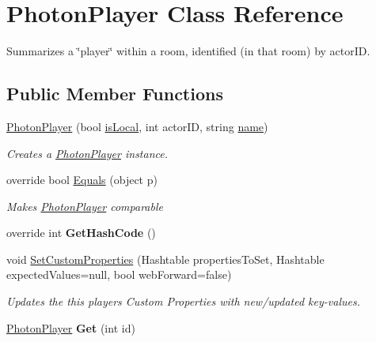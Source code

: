 \hypertarget{class_photon_player}{}\section{Photon\+Player Class Reference}
\label{class_photon_player}


Summarizes a \char`\"{}player\char`\"{} within a room, identified (in that room) by actor\+ID.  


\subsection*{Public Member Functions}
\begin{DoxyCompactItemize}
\item 
\hyperlink{class_photon_player_ab4efd41ca7624963586a30e0d360da67}{Photon\+Player} (bool \hyperlink{class_photon_player_a7d51daf7a538dadae8339e95bf39e692}{is\+Local}, int actor\+ID, string \hyperlink{class_photon_player_a74e5bb916dbfdb6960b8f2f11fa6aba9}{name})
\begin{DoxyCompactList}\small\item\em Creates a \hyperlink{class_photon_player}{Photon\+Player} instance. \end{DoxyCompactList}\item 
override bool \hyperlink{class_photon_player_a2c234cfef38c2013337182a008844398}{Equals} (object p)
\begin{DoxyCompactList}\small\item\em Makes \hyperlink{class_photon_player}{Photon\+Player} comparable \end{DoxyCompactList}\item 
override int {\bfseries Get\+Hash\+Code} ()\hypertarget{class_photon_player_af88693cf6b3b3fb1c8afdb5892fd525c}{}\label{class_photon_player_af88693cf6b3b3fb1c8afdb5892fd525c}

\item 
void \hyperlink{class_photon_player_af8815abb8edaafbe6bddbf328f9612fb}{Set\+Custom\+Properties} (Hashtable properties\+To\+Set, Hashtable expected\+Values=null, bool web\+Forward=false)
\begin{DoxyCompactList}\small\item\em Updates the this player\textquotesingle{}s Custom Properties with new/updated key-\/values. \end{DoxyCompactList}\item 
\hyperlink{class_photon_player}{Photon\+Player} {\bfseries Get} (int id)\hypertarget{class_photon_player_a2aaf48a90dc7e618da31f47c4f1a1c03}{}\label{class_photon_player_a2aaf48a90dc7e618da31f47c4f1a1c03}


\end{DoxyCompactItemize}
